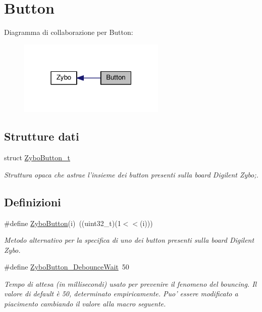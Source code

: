 \hypertarget{group___button}{\section{Button}
\label{group___button}
}
Diagramma di collaborazione per Button\+:\nopagebreak
\begin{figure}[H]
\begin{center}
\leavevmode
\includegraphics[width=199pt]{group___button}
\end{center}
\end{figure}
\subsection*{Strutture dati}
\begin{DoxyCompactItemize}
\item 
struct \hyperlink{struct_zybo_button__t}{Zybo\+Button\+\_\+t}
\begin{DoxyCompactList}\small\item\em Struttura opaca che astrae l'insieme dei button presenti sulla board Digilent Zybo;. \end{DoxyCompactList}\end{DoxyCompactItemize}
\subsection*{Definizioni}
\begin{DoxyCompactItemize}
\item 
\#define \hyperlink{group___button_ga5f85cbc14732f1d83faa75500b67defa}{Zybo\+Button}(i)~((uint32\+\_\+t)(1$<$$<$(i)))
\begin{DoxyCompactList}\small\item\em Metodo alternativo per la specifica di uno dei button presenti sulla board Digilent Zybo. \end{DoxyCompactList}\item 
\#define \hyperlink{group___button_ga8960eefa6a431f50d4fe2a2f8063da3f}{Zybo\+Button\+\_\+\+Debounce\+Wait}~50
\begin{DoxyCompactList}\small\item\em Tempo di attesa (in millisecondi) usato per prevenire il fenomeno del bouncing. Il valore di default è 50, determinato empiricamente. Puo' essere modificato a piacimento cambiando il valore alla macro seguente. \end{DoxyCompactList}\end{DoxyCompactItemize}
